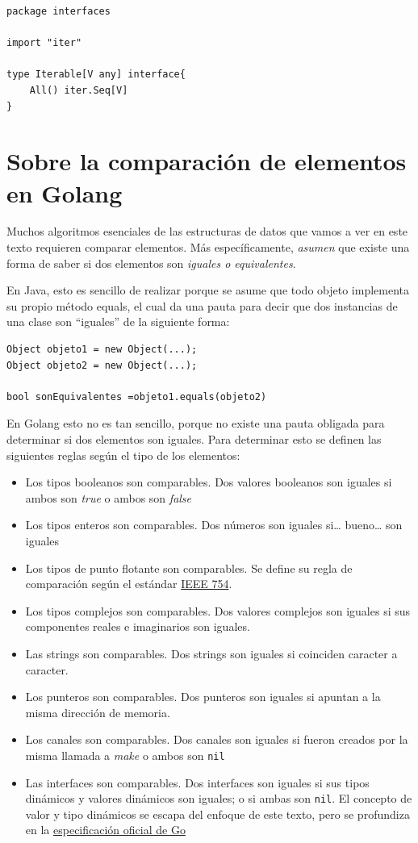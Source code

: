 \documentclass[11pt]{article}
\begin{document}
\begin{verbatim}
package interfaces

import "iter"

type Iterable[V any] interface{
	All() iter.Seq[V]
}

\end{verbatim}
\section{Sobre la comparación de elementos en Golang}
\label{sec:org3327f01}

Muchos algoritmos esenciales de las estructuras de datos que vamos a ver en este texto requieren comparar elementos. Más específicamente, \emph{asumen} que existe una forma de saber si dos elementos son \emph{iguales o equivalentes}.

En Java, esto es sencillo de realizar porque se asume que todo objeto implementa su propio método equals, el cual da una pauta para decir que dos instancias de una clase son ``iguales'' de la siguiente forma:

\begin{verbatim}
Object objeto1 = new Object(...);
Object objeto2 = new Object(...);

bool sonEquivalentes =objeto1.equals(objeto2)

\end{verbatim}

En Golang esto no es tan sencillo, porque no existe una pauta obligada para determinar si dos elementos son iguales. Para determinar esto se definen las siguientes reglas según el tipo de los elementos:

\begin{itemize}
\item Los tipos booleanos son comparables. Dos valores booleanos son iguales si ambos son \emph{true} o ambos son \emph{false}
\item Los tipos enteros son comparables. Dos números son iguales si\ldots{} bueno\ldots{} son iguales
\item Los tipos de punto flotante son comparables. Se define su regla de comparación según el estándar \href{https://ieeexplore.ieee.org/document/8766229}{IEEE 754}.
\item Los tipos complejos son comparables. Dos valores complejos son iguales si sus componentes reales e imaginarios son iguales.
\item Las strings son comparables. Dos strings son iguales si coinciden caracter a caracter.
\item Los punteros son comparables. Dos punteros son iguales si apuntan a la misma dirección de memoria.
\item Los canales son comparables. Dos canales son iguales si fueron creados por la misma llamada a \emph{make} o ambos son \texttt{nil}
\item Las interfaces son comparables. Dos interfaces son iguales si sus tipos dinámicos y valores dinámicos son iguales; o si ambas son \texttt{nil}. El concepto de valor y tipo dinámicos se escapa del enfoque de este texto, pero se profundiza en la \href{https://go.dev/ref/spec\#Variables}{especificación oficial de Go}
\end{itemize}
\end{document}

